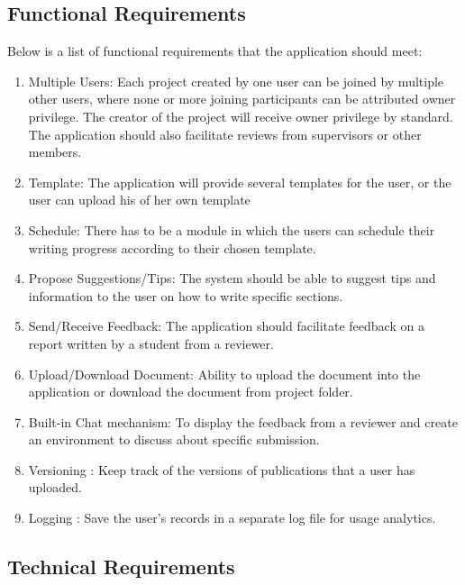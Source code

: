 
\subsection{Functional Requirements} %
\label{sub:functional_requirement}

Below is a list of functional requirements that the application should meet:

\begin{enumerate}
	\item Multiple Users: Each project created by one user can be joined by multiple other users, where none or more joining participants can be attributed owner privilege. The creator of the project will receive owner privilege by standard. The application should also facilitate reviews from supervisors or other members.
	\item Template: The application will provide several templates for the user, or the user can upload his of her own template
	\item Schedule: There has to be a module in which the users can schedule their writing progress according to their chosen template.
	\item Propose Suggestions/Tips: The system should be able to suggest tips and information to the user on how to write specific sections.
	\item Send/Receive Feedback: The application should facilitate feedback on a report written by a student from a reviewer.
	
	\item Upload/Download Document: Ability to upload the document into the application or download the document from project folder.
	\item Built-in Chat mechanism: To display the feedback from a reviewer and create an environment to discuss about specific submission. 
	\item Versioning : Keep track of the versions of publications that a user has uploaded.
	\item Logging : Save the user's records in a separate log file for usage analytics.
\end{enumerate}

\subsection{Technical Requirements} %
\label{sub:technical_requirements}

